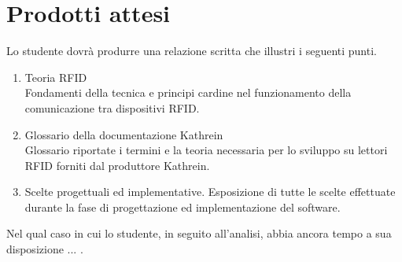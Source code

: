 \section*{Prodotti attesi}
Lo studente dovrà produrre una relazione scritta che illustri i seguenti punti.
\begin{enumerate}
    \item Teoria RFID \\
    Fondamenti della tecnica e principi cardine nel funzionamento della comunicazione tra dispositivi RFID.
    
    \item Glossario della documentazione Kathrein \\
    Glossario riportate i termini e la teoria necessaria per lo sviluppo su lettori RFID forniti dal produttore Kathrein.
    
    \item Scelte progettuali ed implementative.
    Esposizione di tutte le scelte effettuate durante la fase di progettazione ed implementazione del software.
\end{enumerate}

Nel qual caso in cui lo studente, in seguito all'analisi, abbia ancora tempo a sua disposizione ... .
